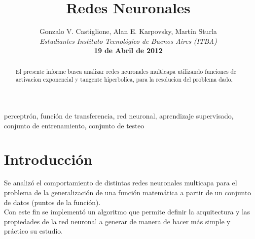 \documentclass[%
    final,
    reprint,
    notitlepage,
    narroweqnarray,
    inline,
    twoside,
    invited
    ]{ieee}
\begin{document}
\title[Redes Neuronales]{%
       Redes Neuronales}

\author[Castiglione, Karpovsky, Sturla]{Gonzalo V. Castiglione, Alan E. Karpovsky, Martín Sturla\\\textit{Estudiantes 
       Instituto Tecnológico de Buenos Aires (ITBA)}\\
\textbf{19 de Abril de 2012}
}


\lognumber{}
\pubitemident{}


\maketitle               

\begin{abstract} 
El presente informe busca analizar redes neuronales multicapa utilizando funciones de activacion exponencial y tangente hiperbolica, 
para la resolucion del problema dado.

\end{abstract}

\begin{keywords}
perceptrón, función de transferencia, red neuronal, aprendizaje supervisado, conjunto de entrenamiento, conjunto de testeo
\end{keywords}

\section{Introducción}

\par Se analizó el comportamiento de distintas redes neuronales multicapa para el problema de la generalización 
de una función matemática a partir de un conjunto de datos (puntos de la función).\\
Con este fin se implementó un algoritmo que permite definir la arquitectura y las propiedades de la red neuronal 
a generar de manera de hacer más simple y práctico su estudio. \\
\end{document}
